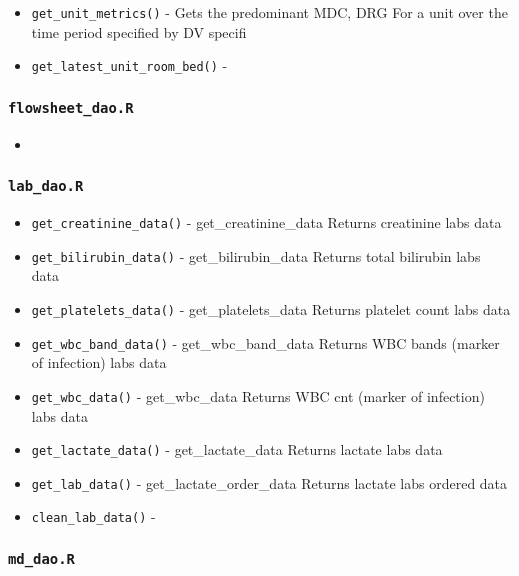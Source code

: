 \documentclass[
]{book}
\providecommand{\tightlist}{%
  \setlength{\itemsep}{0pt}\setlength{\parskip}{0pt}}
\begin{document}
\begin{itemize}
\tightlist
\item
  \texttt{get\_unit\_metrics()} - Gets the predominant MDC, DRG For a unit over the time period specified by DV specifi
\item
  \texttt{get\_latest\_unit\_room\_bed()} -
\end{itemize}

\hypertarget{flowsheet_dao.r}{%
\subsubsection{\texorpdfstring{\texttt{flowsheet\_dao.R}}{flowsheet\_dao.R}}\label{flowsheet_dao.r}}

\begin{itemize}
\item
\end{itemize}

\hypertarget{lab_dao.r-1}{%
\subsubsection{\texorpdfstring{\texttt{lab\_dao.R}}{lab\_dao.R}}\label{lab_dao.r-1}}

\begin{itemize}
\tightlist
\item
  \texttt{get\_creatinine\_data()} - get\_creatinine\_data Returns creatinine labs data
\item
  \texttt{get\_bilirubin\_data()} - get\_bilirubin\_data Returns total bilirubin labs data
\item
  \texttt{get\_platelets\_data()} - get\_platelets\_data Returns platelet count labs data
\item
  \texttt{get\_wbc\_band\_data()} - get\_wbc\_band\_data Returns WBC bands (marker of infection) labs data
\item
  \texttt{get\_wbc\_data()} - get\_wbc\_data Returns WBC cnt (marker of infection) labs data
\item
  \texttt{get\_lactate\_data()} - get\_lactate\_data Returns lactate labs data
\item
  \texttt{get\_lab\_data()} - get\_lactate\_order\_data Returns lactate labs ordered data
\item
  \texttt{clean\_lab\_data()} -
\end{itemize}

\hypertarget{md_dao.r}{%
\subsubsection{\texorpdfstring{\texttt{md\_dao.R}}{md\_dao.R}}\label{md_dao.r}}
\end{document}
